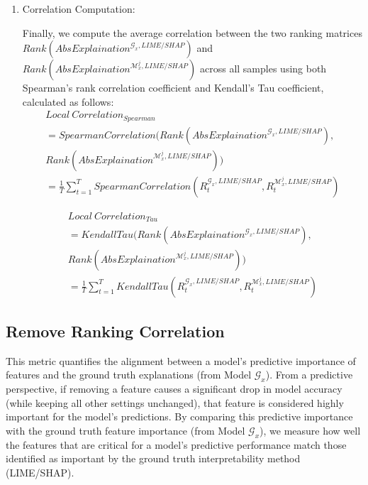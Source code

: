 \documentclass{article}
\begin{document}
\begin{enumerate}
    $$R_{t}^{\mathcal{M}_{x}^{j},LIME/SHAP} = (r_{t,1}^{\mathcal{M}_{x}^{j},LIME/SHAP},\ r_{t,2}^{\mathcal{M}_{x}^{j},LIME/SHAP},\ldots r_{t,m}^{\mathcal{M}_{x}^{j},LIME/SHAP})$$
    
    \item Correlation Computation:
    
    Finally, we compute the average correlation between the two ranking matrices $Rank\left( {AbsExplaination}^{\mathcal{G}_{x},LIME/SHAP} \right)$ and \\ $Rank\left({AbsExplaination}^{\mathcal{M}_{x}^{j},LIME/SHAP} \right)$ across all samples using both Spearman's rank correlation coefficient and Kendall's Tau coefficient, calculated as follows:
\begin{align}
    {Local\ Correlation}_{Spearman} \nonumber \\ =
    SpearmanCorrelation(Rank\left( {AbsExplaination}^{\mathcal{G}_{x},LIME/SHAP} \right), \nonumber \\ Rank\left( {AbsExplaination}^{\mathcal{M}_{x}^{j},LIME/SHAP} \right)) \nonumber \\= \frac{1}{T}\sum_{t = 1}^{T}{SpearmanCorrelation(R_{t}^{\mathcal{G}_{x},LIME/SHAP},R_{t}^{\mathcal{M}_{x}^{j},LIME/SHAP})} \nonumber
\end{align}
    
\begin{align}
    {Local\ Correlation}_{Tau} \nonumber \\ =
    KendallTau(Rank\left( {AbsExplaination}^{\mathcal{G}_{x},LIME/SHAP} \right),\nonumber \\ Rank\left( {AbsExplaination}^{\mathcal{M}_{x}^{j},LIME/SHAP} \right)) \nonumber \\ = \frac{1}{T}\sum_{t = 1}^{T}{KendallTau(R_{t}^{\mathcal{G}_{x},LIME/SHAP},R_{t}^{\mathcal{M}_{x}^{j},LIME/SHAP})}\nonumber
\end{align}
    
\end{enumerate}

\subsection{Remove Ranking Correlation}

This metric quantifies the alignment between a model's predictive importance of features and the ground truth explanations (from Model $\mathcal{G}_{x}$). From a predictive perspective, if removing a feature causes a significant drop in model accuracy (while keeping all other settings unchanged), that feature is considered highly important for the model's predictions. By comparing this predictive importance with the ground truth feature importance (from Model $\mathcal{G}_{x}$), we measure how well the features that are critical for a model's predictive performance match those identified as important by the ground truth interpretability method (LIME/SHAP).
\end{document}
